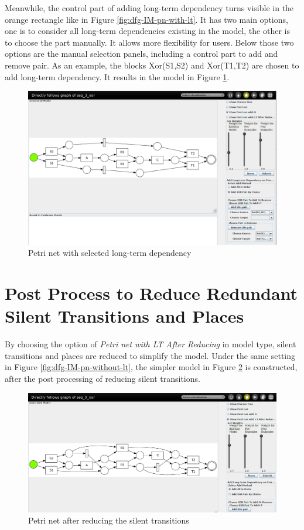 Meanwhile, the control part of adding long-term dependency turns visible in the orange rectangle like in Figure \ref{fig:dfg-IM-pn-with-lt}.  It has two main options, one is to consider all long-term dependencies existing in the model, the other is to choose the part manually. It allows more flexibility for users. Below those two options are the manual selection panels, including a control part to add and remove pair. As an example, the blocks Xor(S1,S2) and Xor(T1,T2) are chosen to add long-term dependency. It results in the model in Figure \ref{fig:dfg-IM-pn-with-lt-m}. 
\begin{figure}[h]
	\centering
	\includegraphics[width=\textwidth]{figures/implementation/dfg-IM-pn-with-lt-manual.png}
	\caption{Petri net with selected long-term dependency}
	\label{fig:dfg-IM-pn-with-lt-m}
\end{figure}
\section{Post Process to Reduce Redundant Silent Transitions and Places}
By choosing the option of \emph{Petri net with LT After Reducing} in model type, silent transitions and places are reduced to simplify the model.
Under the same setting in Figure \ref{fig:dfg-IM-pn-without-lt}, the simpler model in Figure \ref{fig:dfg-IM-pn-with-lt-r} is constructed, after the post processing of reducing silent transitions.
\begin{figure}[h]
	\centering
	\includegraphics[width=\textwidth]{figures/implementation/dfg-IM-pn-with-lt-reduced.png}
	\caption{Petri net after reducing the silent transitions}
	\label{fig:dfg-IM-pn-with-lt-r}
\end{figure}


